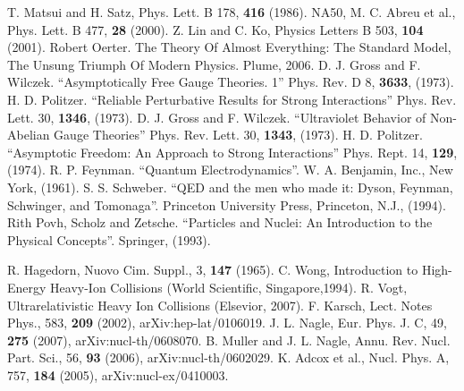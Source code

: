 \begin{thebibliography}{999}
 T. Matsui and H. Satz, Phys. Lett. B 178, {\bf 416} (1986).
 NA50, M. C. Abreu et al., Phys. Lett. B 477, {\bf 28} (2000).
 Z. Lin and C. Ko, Physics Letters B 503, {\bf 104} (2001).
 Robert Oerter. The Theory Of Almost Everything: The Standard Model, The
Unsung Triumph Of Modern Physics. Plume, 2006.
 D. J. Gross and F. Wilczek. ``Asymptotically Free Gauge Theories. 1'' Phys. Rev. D 8, {\bf 3633}, (1973).
 H. D. Politzer. ``Reliable Perturbative Results for Strong Interactions'' Phys. Rev. Lett. 30, {\bf 1346}, (1973).
 D. J. Gross and F. Wilczek. ``Ultraviolet Behavior of Non-Abelian Gauge Theories'' Phys. Rev. Lett. 30, {\bf 1343}, (1973).
 H. D. Politzer. ``Asymptotic Freedom: An Approach to Strong Interactions'' Phys. Rept. 14, {\bf 129}, (1974).
  R. P. Feynman. ``Quantum Electrodynamics''. W. A. Benjamin, Inc., New York, (1961).
 S. S. Schweber. ``QED and the men who made it: Dyson, Feynman, Schwinger, and Tomonaga''. Princeton University Press, Princeton, N.J., (1994).
 Rith Povh, Scholz and Zetsche. ``Particles and Nuclei: An Introduction to the Physical Concepts''. Springer, (1993).

 R. Hagedorn, Nuovo Cim. Suppl., 3, {\bf 147} (1965).
 C. Wong, Introduction to High-Energy Heavy-Ion Collisions (World Scientific, Singapore,1994).
 R. Vogt, Ultrarelativistic Heavy Ion Collisions (Elsevior, 2007).
 F. Karsch, Lect. Notes Phys., 583, {\bf 209} (2002), arXiv:hep-lat/0106019.
 J. L. Nagle, Eur. Phys. J. C, 49, {\bf 275} (2007), arXiv:nucl-th/0608070.
 B. Muller and J. L. Nagle, Annu. Rev. Nucl. Part. Sci., 56, {\bf 93} (2006), arXiv:nucl-th/0602029.
 K. Adcox et al., Nucl. Phys. A, 757, {\bf 184} (2005), arXiv:nucl-ex/0410003.


\end{thebibliography}
